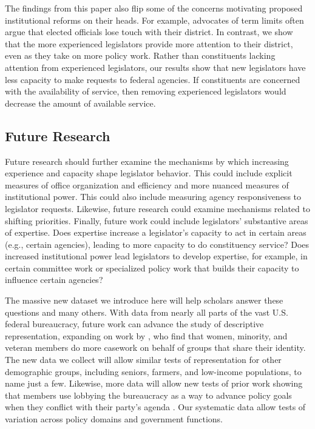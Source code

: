 \documentclass[12pt]{article}
\begin{document}
{%
The findings from this paper also flip some of the concerns motivating proposed institutional reforms on their heads. For example, advocates of term limits often argue that elected officials lose touch with their district. In contrast, we show that the more experienced legislators provide more attention to their district, even as they take on more policy work. Rather than constituents lacking attention from experienced legislators, our results show that new legislators have less capacity to make requests to federal agencies. If constituents are concerned with the availability of service, then removing experienced legislators would decrease the amount of available service.   



\subsection{Future Research}

Future research should further examine the mechanisms by which increasing experience and capacity shape legislator behavior. This could include explicit measures of office organization and efficiency and more nuanced measures of institutional power. This could also include measuring agency responsiveness to legislator requests. Likewise, future research could examine mechanisms related to shifting priorities. Finally, future work could include legislators' substantive areas of expertise. Does expertise increase a legislator's capacity to act in certain areas (e.g., certain agencies), leading to more capacity to do constituency service? Does increased institutional power lead legislators to develop expertise, for example, in certain committee work or specialized policy work that builds their capacity to influence certain agencies? 

The massive new dataset we introduce here will help scholars answer these questions and many others. With data from nearly all parts of the vast U.S. federal bureaucracy, future work can advance the study of descriptive representation, expanding on work by \citet{LowandeRitchieLauterbach2018}, who find that women, minority, and veteran members do more casework on behalf of groups that share their identity. The new data we collect will allow similar tests of representation for other demographic groups, including seniors, farmers, and low-income populations, to name just a few. Likewise, more data will allow new tests of prior work showing that members use lobbying the bureaucracy as a way to advance policy goals when they conflict with their party's agenda \citep{Ritchie2017}. Our systematic data allow tests of variation across policy domains and government functions. 

}
\end{document}
